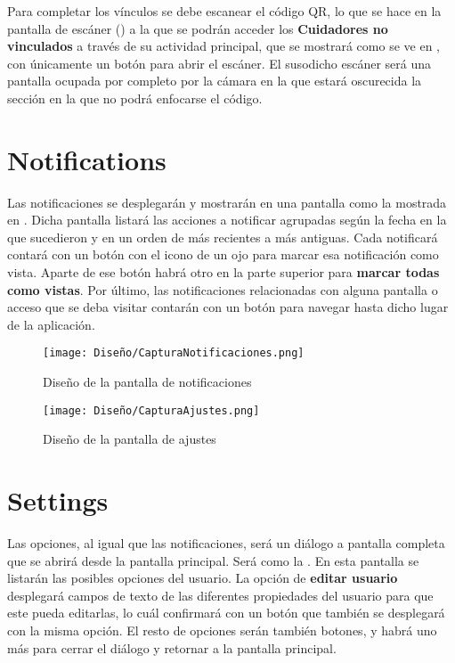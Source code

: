 Para completar los vínculos se debe escanear el código QR, lo que se hace en la pantalla de escáner () a la que se podrán acceder los \textbf{Cuidadores no vinculados} a través de su actividad principal, que se mostrará como se ve en , con únicamente un botón para abrir el escáner. El susodicho escáner será una pantalla ocupada por completo por la cámara en la que estará oscurecida la sección en la que no podrá enfocarse el código.

\section{Notifications}

Las notificaciones se desplegarán y mostrarán en una pantalla como la mostrada en . Dicha pantalla listará las acciones a notificar agrupadas según la fecha en la que sucedieron y en un orden de más recientes a más antiguas. Cada notificará contará con un botón con el icono de un ojo para marcar esa notificación como vista. Aparte de ese botón habrá otro en la parte superior para \textbf{marcar todas como vistas}. Por último, las notificaciones relacionadas con alguna pantalla o acceso que se deba visitar contarán con un botón para navegar hasta dicho lugar de la aplicación.



\begin{figure}[H]
    \centering
    \begin{minipage}{0.4\textwidth}
        \centering
        \texttt{[image: Diseño/CapturaNotificaciones.png]}
        \caption{Diseño de la pantalla de notificaciones}
        \label{scr:notifications}
    \end{minipage}\hfill
    \begin{minipage}{0.4\textwidth}
        \centering
        \texttt{[image: Diseño/CapturaAjustes.png]}
        \caption{Diseño de la pantalla de ajustes}
        \label{scr:settings}
    \end{minipage}\hfill
\end{figure}

\section{Settings}

Las opciones, al igual que las notificaciones, será un diálogo a pantalla completa que se abrirá desde la pantalla principal. Será como la . En esta pantalla se listarán las posibles opciones del usuario. La opción de \textbf{editar usuario} desplegará campos de texto de las diferentes propiedades del usuario para que este pueda editarlas, lo cuál confirmará con un botón que también se desplegará con la misma opción. El resto de opciones serán también botones, y habrá uno más para cerrar el diálogo y retornar a la pantalla principal.


